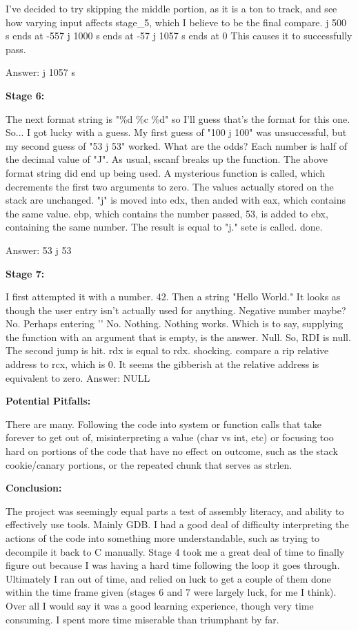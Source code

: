 \documentclass{article}
\begin{document}
    I've decided to try skipping the middle portion, as it is a ton to track, and see how varying input affects stage\_5, which I believe to be the final compare.
    j 500 s ends at -557
    j 1000 s ends at -57
    j 1057 s ends at 0
    This causes it to successfully pass.

    Answer: j 1057 s


    \textbf{Stage 6:}

    \bigskip

    The next format string is "\%d \%c \%d" so I'll guess that's the format for this one.
    So... I got lucky with a guess.
    My first guess of "100 j 100" was unsuccessful, but my second guess of "53 j 53" worked. What are the odds?
    Each number is half of the decimal value of "J".
    As usual, sscanf breaks up the function. The above format string did end up being used.
    A mysterious function is called, which decrements the first two arguments to zero. The values actually stored on the stack are unchanged.
    "j" is moved into edx, then anded with eax, which contains the same value.
    ebp, which contains the number passed, 53, is added to ebx, containing the same number. The result is equal to "j." 
    sete is called.
    done.

    Answer: 53 j 53

    \bigskip

    \textbf{Stage 7:}

    \bigskip

        I first attempted it with a number. 42. Then a string "Hello World."
It looks as though the user entry isn't actually used for anything.
Negative number maybe? No.
Perhaps entering '\0' No.
Nothing. Nothing works. Which is to say, supplying the function with an argument that is empty, is the answer. Null.
So, RDI is null.
The second jump is hit. rdx is equal to rdx. shocking.
compare a rip relative address to rcx, which is 0.
It seems the gibberish at the relative address is equivalent to zero.
Answer: NULL

    \bigskip


    \textbf{Potential Pitfalls:}

    There are many. Following the code into system or function calls that take forever to get out of, misinterpreting a value (char vs int, etc) or focusing too hard on portions of the code that have no effect on outcome, such as the stack cookie/canary portions, or the repeated chunk that serves as strlen.


    \textbf{Conclusion:}

    The project was seemingly equal parts a test of assembly literacy, and ability to effectively use tools. Mainly GDB. I had a good deal of difficulty interpreting the actions of the code into something more understandable, such as trying to decompile it back to C manually. Stage 4 took me a great deal of time to finally figure out because I was having a hard time following the loop it goes through. Ultimately I ran out of time, and relied on luck to get a couple of them done within the time frame given (stages 6 and 7 were largely luck, for me I think).
    Over all I would say it was a good learning experience, though very time consuming. I spent more time miserable than triumphant by far.
\end{document}
